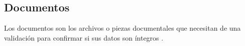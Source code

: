 \subsection{Documentos}
Los documentos son los  archivos o piezas documentales que necesitan de una validación para confirmar si sus datos son íntegros \cite[]{avila_implementacion_2015}. 